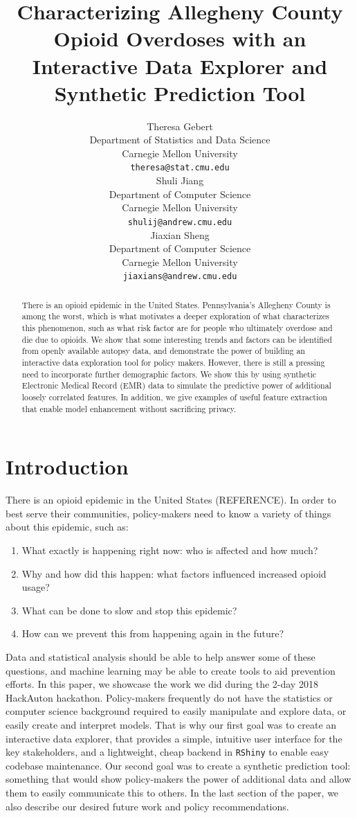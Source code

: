 \documentclass{article}
\title{Characterizing Allegheny County Opioid Overdoses with an Interactive Data Explorer and Synthetic Prediction Tool}
\author{
  Theresa Gebert\\
  Department of Statistics and Data Science\\
  Carnegie Mellon University\\
  \texttt{theresa@stat.cmu.edu} \\
  \And
  Shuli Jiang \\
  Department of Computer Science\\
  Carnegie Mellon University\\
  \texttt{shulij@andrew.cmu.edu} \\
  \AND
  Jiaxian Sheng \\
  Department of Computer Science\\
  Carnegie Mellon University\\
  \texttt{jiaxians@andrew.cmu.edu} \\
}
\begin{document}

\maketitle

\begin{abstract}
There is an opioid epidemic in the United States. Pennsylvania's Allegheny County is among the worst, which is what motivates a deeper exploration of what characterizes this phenomenon, such as what risk factor are for people who ultimately overdose and die due to opioids. We show that some interesting trends and factors can be identified from openly available autopsy data, and demonstrate the power of building an interactive data exploration tool for policy makers. However, there is still a pressing need to incorporate further demographic factors. We show this by using synthetic Electronic Medical Record (EMR) data to simulate the predictive power of additional loosely correlated features. In addition, we give examples of useful feature extraction that enable model enhancement without sacrificing privacy.
\end{abstract}

\section{Introduction}
There is an opioid epidemic in the United States (REFERENCE). In order to best serve their communities, policy-makers need to know a variety of things about this epidemic, such as:
\begin{enumerate}
\item What exactly is happening right now: who is affected and how much?
\item Why and how did this happen: what factors influenced increased opioid usage?
\item What can be done to slow and stop this epidemic?
\item How can we prevent this from happening again in the future?
\end{enumerate}
Data and statistical analysis should be able to help answer some of these questions, and machine learning may be able to create tools to aid prevention efforts. In this paper, we showcase the work we did during the 2-day 2018 HackAuton hackathon. Policy-makers frequently do not have the statistics or computer science background required to easily manipulate and explore data, or easily create and interpret models. That is why our first goal was to create an interactive data explorer, that provides a simple, intuitive user interface for the key stakeholders, and a lightweight, cheap backend in \texttt{RShiny} to enable easy codebase maintenance. Our second goal was to create a synthetic prediction tool: something that would show policy-makers the power of additional data and allow them to easily communicate this to others. In the last section of the paper, we also describe our desired future work and policy recommendations.
\end{document}
